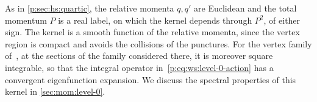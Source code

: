 As in \cref{p:sec:hs:quartic}, the relative momenta $q, q'$ are Euclidean and the total momentum $P$ is a real label, on which the kernel depends through $P^2$, of either sign.
The kernel is a smooth function of the relative momenta, since the vertex region is compact and avoids the collisions of the punctures.
For the vertex family of~\cite{Erbin:2026:SL2CVerticesClosed}, at the sections of the family considered there, it is moreover square integrable, so that the integral operator in~\eqref{p:eq:ws:level-0-action} has a convergent eigenfunction expansion.
We discuss the spectral properties of this kernel in \cref{sec:mom:level-0}.

